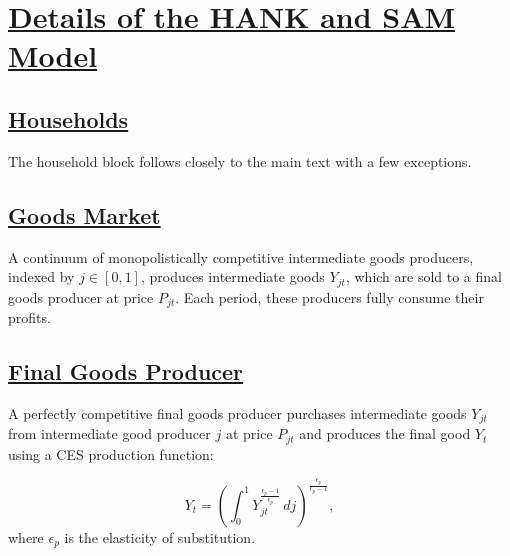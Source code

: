\documentclass[\latexroot/\projectname]{subfiles}
\begin{document}
\FloatBarrier

\section{\href{https://econ-ark.github.io/HAFiscal/\#sec:appendix-hank}{Details of the HANK and SAM Model}}
\whenintegrated{\label{sec:appendix-hank}} %


\subsection{\href{https://econ-ark.github.io/HAFiscal/\#sec:hank-households}{Households}}\whenintegrated{\label{sec:hank-households}}

The household block follows closely to the main text with a few exceptions. 

\subsection{\href{https://econ-ark.github.io/HAFiscal/\#sec:goods-market}{Goods Market}}\whenintegrated{\label{sec:goods-market}}

A continuum of monopolistically competitive intermediate goods producers, indexed by \( j \in [0,1] \), produces intermediate goods \( Y_{jt} \), which are sold to a final goods producer at price \( P_{jt} \). Each period, these producers fully consume their profits.

\subsection{\href{https://econ-ark.github.io/HAFiscal/\#sec:hank-final-goods-producer}{Final Goods Producer}}\whenintegrated{\label{sec:hank-final-goods-producer}}

A perfectly competitive final goods producer purchases intermediate goods \( Y_{jt} \) from intermediate good producer $j$ at price \( P_{jt} \) and produces the final good \( Y_t \) using a CES production function:

\[
  Y_{t} = {\left(\int_{0}^{1} Y_{jt}^{\frac{\epsilon_{p}-1}{\epsilon_{p}}}\, dj\right)}^{\frac{\epsilon_{p}}{\epsilon_{p}-1}},
\]
where $\epsilon_{p}$ is the elasticity of substitution.
\end{document}

